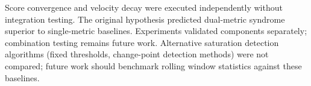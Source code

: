 
Score convergence and velocity decay were executed independently without integration testing. The original hypothesis predicted dual-metric syndrome superior to single-metric baselines. Experiments validated components separately; combination testing remains future work. Alternative saturation detection algorithms (fixed thresholds, change-point detection methods) were not compared; future work should benchmark rolling window statistics against these baselines.
